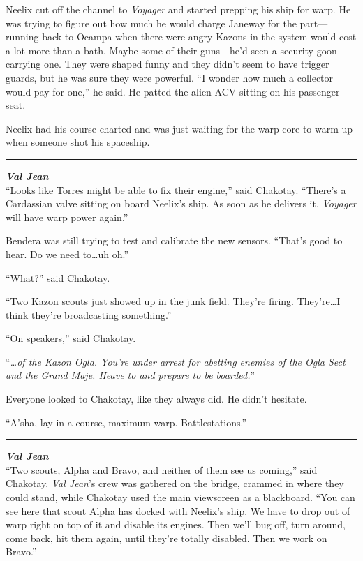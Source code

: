 \documentclass[twoside,letterpaper,12pt]{memoir}
\begin{document}
Neelix cut off the channel to \textit{Voyager} and started prepping his ship for warp. He was trying to figure out how much he would charge Janeway for the part---running back to Ocampa when there were angry Kazons in the system would cost a lot more than a bath. Maybe some of their guns---he'd seen a security goon carrying one. They were shaped funny and they didn't seem to have trigger guards, but he was sure they were powerful. ``I wonder how much a collector would pay for one,'' he said. He patted the alien ACV sitting on his passenger seat.

Neelix had his course charted and was just waiting for the warp core to warm up when someone shot his spaceship.

\fancybreak{\rule{3cm}{0.4 pt}}
\noindent\textit{\textbf{Val Jean}}\\

``Looks like Torres might be able to fix their engine,'' said Chakotay. ``There’s a Cardassian valve sitting on board Neelix's ship. As soon as he delivers it, \textit{Voyager} will have warp power again.''

Bendera was still trying to test and calibrate the new sensors. ``That's good to hear. Do we need to\ldots uh oh.''

``What?'' said Chakotay.

``Two Kazon scouts just showed up in the junk field. They're firing. They're\ldots I think they're broadcasting something.''

``On speakers,'' said Chakotay.

``\textit{\ldots of the Kazon Ogla. You're under arrest for abetting enemies of the Ogla Sect and the Grand Maje. Heave to and prepare to be boarded.}''

Everyone looked to Chakotay, like they always did. He didn't hesitate.

``A'sha, lay in a course, maximum warp. Battlestations.''

\fancybreak{\rule{3cm}{0.4 pt}}
\noindent\textit{\textbf{Val Jean}}\\

``Two scouts, Alpha and Bravo, and neither of them see us coming,'' said Chakotay. \textit{Val Jean}'s crew was gathered on the bridge, crammed in where they could stand, while Chakotay used the main viewscreen as a blackboard. ``You can see here that scout Alpha has docked with Neelix's ship. We have to drop out of warp right on top of it and disable its engines. Then we'll bug off, turn around, come back, hit them again, until they’re totally disabled. Then we work on Bravo.''
\end{document}
